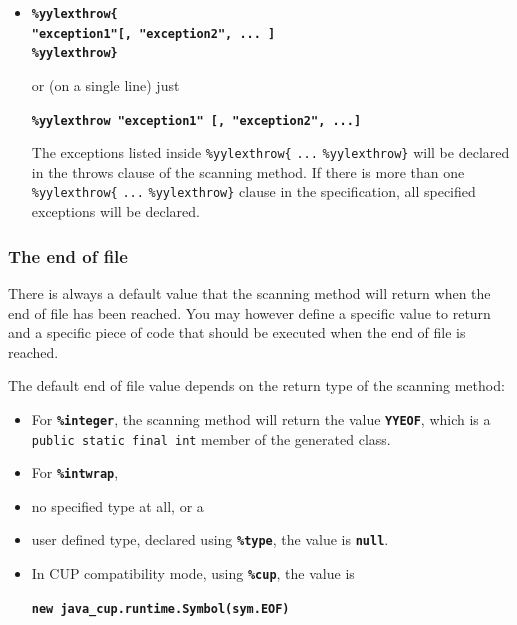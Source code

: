 \documentclass[11pt]{scrartcl}
\begin{document}
\begin{itemize}
\item
{\bfseries \verb+%yylexthrow{+}\\
{\bfseries \texttt{"exception1"[, "exception2", ... ]}}\\
{\bfseries \verb+%yylexthrow}+}

or (on a single line) just

{\bfseries \texttt{\%yylexthrow "exception1" [,  "exception2", ...]}}

The exceptions listed inside \verb+%yylexthrow{+ \texttt{...} \verb+%yylexthrow}+ 
will be declared in the throws clause of the scanning method. If there is
more than one \verb+%yylexthrow{+ \texttt{...} \verb+%yylexthrow}+ clause in
the specification, all specified exceptions will be declared.
\end{itemize}

\subsubsection{The end of file}\label{EOF}
There is always a default value that the scanning method will return when
the end of file has been reached. You may however define a specific value
to return and a specific piece of code that should be executed when the
end of file is reached.

The default end of file value depends on the return type of the scanning method:
\begin{itemize}
\item
For {\bfseries \texttt{\%integer}}, the scanning method will return the value
{\bfseries \texttt{YYEOF}}, which is a \texttt{public static final int} member
of the generated class.

\item
For {\bfseries \texttt{\%intwrap}}, 
\item
no specified type at all, or a 
\item
user defined type, declared using {\bfseries \texttt{\%type}}, the value is {\bfseries \texttt{null}}.

\item
In CUP compatibility mode, using {\bfseries \texttt{\%cup}}, the value is 

{\bfseries \texttt{new java\_cup.runtime.Symbol(sym.EOF)}}
\end{itemize}
\end{document}
